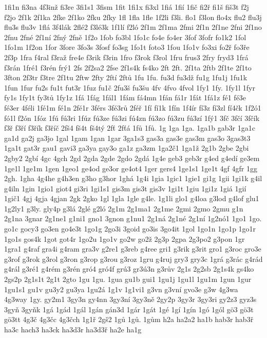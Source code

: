 {1fi1n
fi3na
4f3inž
fi3re
3fi1s1
3fism
1fit
1fi1x
fi3xl
1fiá
1fií
1fič
fi2ř
fi1š
fiš3t
f2j
f2jo
2f1k
2f1ka
2fke
2f1ko
2fku
2fky
1fl
1fla
1fle
1f2li
f3li.
flo1
f3lon
flo4x
flu2
flu3j
flu3s
flu3v
1flá
3f4lák
2flé2
f3lé3k
1f1lí
f2ló
2f1m
2f1ma
2fmi
2f1n
2f1ne
2fni
2f1no
2fnu
2fné
2f1ní
2fný
2fně
1f2o
1fob
fo3bl
1fo1c
fo4e
fo4er
3fof
3fofr
fo1k2
1fol
1fo1m
1f2on
1for
3fore
3fo3s
3fosf
fo3sg
1fo1t
foto3
1fou
1fo1v
fo3xi
fo2ř
fo3ře
2f3p
1fra
f4ral
f3raž
fre4e
f3rik
f3rin
1fro
f3rok
f3rol
1fru
frus3
2fry
fryd3
1frá
f3rán
1fré1
f3rén
frý1
2fs
2f2sa2
2fse
2f1s4k
fs4ko
2ft
2ft.
2f1ta
2ftb
2f1te
2f1to
3fton
2f3tr
f3tre
2f1tu
2ftw
2fty
2ftí
2ftů
1fu
1fu.
fu3d
fu3dž
fu1g
1fu1j
1fu1k
1fun
1fur
fu2s
fu1t
fut3r
1fuz
fu1č
2fu3š
fu3šu
4fv
4fvo
4fvol
1fy1
1fy.
1fy1l
1fyr
fy1s
1fy1t
fy3tů
1fy1z
1fá
1fág
1fál1
1fám
fá4mn
1fán
fá1r
1fát
1fá1z
fé1
fé3e
fé3er
4féli
1fé1m
fé1n
2fé1r
3férs
3fé3rů
2féř
1fí
fí1k
1fín
1f4ír
fí3z
fí3zl
fí4čk
1f2ó1
fó1l
f2ón
1fóz
1fú
fú3ri
1fúz
fú3ze
fú3zi
fú4zn
fú3zo
fú3zu
fú3zí
1fý1
3fč
3fčí
3fčík
f3ř
f3ří
f3řík
f3říč
2fš4
fš4t
fš4tý
2fť
2fťá
1fů
1fů.
1g
1ga
1ga.
1ga1b
gab3r
1ga1c
ga1d
ga2j
ga3jo
1gal
1gam
1gan
1gar
3ga1s3
gas3a
gas3e
gas3m
gas3o
3gas3t3
1ga1t
gat3r
gau1
gavi3
ga3ya
gay3o
ga1z
ga3zm
1ga2č1
1ga1ž
2g1b
2gbe
2gbi
2gby2
2gbí
4gc
4gch
2gd
2gda
2gde
2gdo
2gdá
1g4e
geb3
geb3r
g4ed
g4edí
ge3em
1ge1l
1ge1m
1gen
1geo1
ge4od
ge3or
ge4ot4
1ger
gers4
1ge1s1
1ge1t
4gf
4gfr
1gg
2gh.
1gha
4g4he
g4h3en
g3ho
g3hor
1ghá
1g4i
1gia
1gic1
1gie1
gi1g
1gii
1gi1k
g4il
g4iln
1gin
1gio1
giot4
gi3ri
1gi1s1
gis3m
gis3t
gis3v
1gi1t
1giu
1gi1z
1giá
1gií
1gič1
4gj
4gja
4gjan
2gk
2gko
1gl
1gla
1gle
g4le.
1g1li
glo1
g4loa
g3lod
g4lof
glu1
1g2ly1
g3ly.
gly4p
g3lá
2glé
g2ló
2g1m
2g1ma1
2g1me
2gmi
2gmo
2gmu
g1n
2g1na
3gnar
2g1ne1
g1ni1
gno1
3gnon
g1nu1
2g1ná
2g1né
2g1ní
1g2nó1
1go1
1go.
go1c
gocy3
go3en
go4e3t
1go1g
2go3i
3goid
go3is
3go4it
1gol
1go1n
1go1p
1go1r
1go1s
gos4k
1got
got4r
1go2u
1go1v
go2w
go2ž
2g3p
2gpa
2g3po2
g3pon
1gr
1gra1
g4raf
gra4i
g4ram
gra3v
g2re1
g3reb
g4ree
gri1
g3rik
g3rit
gro1
g3roc
gro3e
g3rof
g3rok
g3rol
g3ron
g3rop
g3rou
g3roz
1gru
g4ruj
gry3
gry3c
1grá
g3rác
g4rád
g4rál
g3ré1
g4rém
g3rén
gró4
gró4f
grú3
gr3ú3n
g3rův
2g1s
2g2sb
2g1s4k
gs4ko
2gs2p
2g1s1t
2g1t
2gto
1gu
1gu.
1gua
gu1b
gui1
1gu1j
1gu1l
1gu1m
1gun
1gur
1gu1s1
gu1v
gu3y2
gu3ya
1gu2á
1g1v
1g1vi1
g3vn
g3vní
gvo3e
g3w
4g3wa
4g3way
1gy.
gy2m1
3gy3n
gy4nn
3gy3ní
3gy3ně
2gy2p
3gy3r
3gy3ri
gy2z3
gyz3s
3gyň
3gyňk
1gá
1gád
1gál
1gán
gán3d
1gár
1gát
1gé
1gí
1gín
1gó
1gól
gö3
gö3t
gö3tt
4g3č
4g3čc
4g3čch
1g1ř
2gš2
1gů
1gů.
1gům
h2a
ha2a2
ha1b
hab3r
hab3ř
ha3c
hach3
ha3ck
ha3d3r
ha3d3ř
ha2e
ha1g
}
